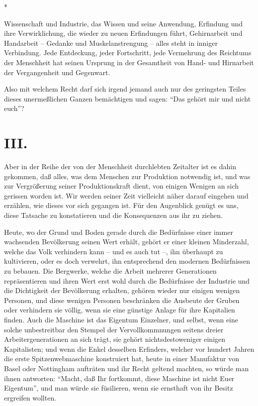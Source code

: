 \documentclass{scrbook}
\begin{document}
\begin{center}*\end{center}

Wissenschaft und Industrie, das Wissen und seine Anwendung, Erfindung und ihre Verwirklichung, die wieder zu neuen Erfindungen führt, Gehirnarbeit und Handarbeit – Gedanke und Muskelanstrengung – alles steht in inniger Verbindung. Jede Entdeckung, jeder Fortschritt, jede Vermehrung des Reichtums der Menschheit hat seinen Ursprung in der Gesamtheit von Hand- und Hirnarbeit der Vergangenheit und Gegenwart.

Also mit welchem Recht darf sich irgend jemand auch nur des geringsten Teiles dieses unermeßlichen Ganzen bemächtigen und sagen: ``Das gehört mir und nicht euch''?

\section*{III.}

Aber in der Reihe der von der Menschheit durchlebten Zeitalter ist es dahin gekommen, daß alles, was dem Menschen zur Produktion notwendig ist, und was zur Vergrößerung seiner Produktionskraft dient, von einigen Wenigen an sich gerissen worden ist. Wir werden seiner Zeit vielleicht näher darauf eingehen und erzählen, wie dieses vor sich gegangen ist. Für den Augenblick genügt es uns, diese Tatsache zu konstatieren und die Konsequenzen aus ihr zu ziehen.

Heute, wo der Grund und Boden gerade durch die Bedürfnisse einer immer wachsenden Bevölkerung seinen Wert erhält, gehört er einer kleinen Minderzahl, welche das Volk verhindern kann – und es auch tut –, ihn überhaupt zu kultivieren, oder es doch verwehrt, ihn entsprechend den modernen Bedürfnissen zu bebauen. Die Bergwerke, welche die Arbeit mehrerer Generationen repräsentieren und ihren Wert erst wohl durch die Bedürfnisse der Industrie und die Dichtigkeit der Bevölkerung erhalten, gehören wieder nur einigen wenigen Personen, und diese wenigen Personen beschränken die Ausbeute der Gruben oder verhindern sie völlig, wenn sie eine günstige Anlage für ihre Kapitalien finden. Auch die Maschine ist das Eigentum Einzelner, und selbst, wenn eine solche unbestreitbar den Stempel der Vervollkommnungen seitens dreier Arbeitergenerationen an sich trägt, sie gehört nichtsdestoweniger einigen Kapitalisten; und wenn die Enkel desselben Erfinders, welcher vor hundert Jahren die erste Spitzenwebmaschine konstruiert hat, heute in einer Manufaktur von Basel oder Nottingham aufträten und ihr Recht geltend machten, so würde man ihnen antworten: ``Macht, daß Ihr fortkommt, diese Maschine ist nicht Euer Eigentum'', und man würde sie füsilieren, wenn sie ernsthaft von ihr Besitz ergreifen wollten.
\end{document}
